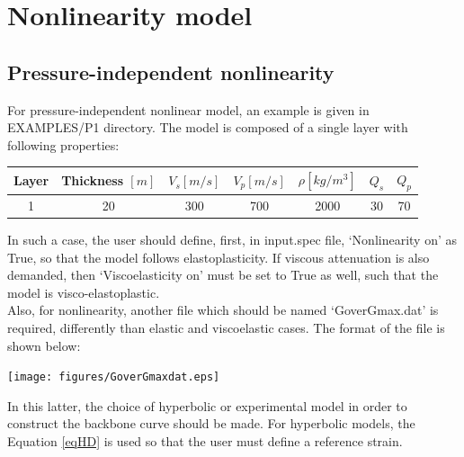 \section{Nonlinearity model}

\subsection{Pressure-independent nonlinearity}

For pressure-independent nonlinear model, an example is given in EXAMPLES\slash P1 directory.  The model is composed of a single layer with following properties: \\

\vspace{1 cm}
\label{tabP1}
\begin{center}
\begin{tabular}{|c|c|c|c|c|c|c|} \hline                                
Layer & Thickness $[m]$ & $V_{s} [m/s] $ &$V_{p} [m/s] $ & $\rho [kg/m^{3}]$ & $Q_{s}$ & $Q_{p}$ \\ \hline \hline 
1     &  20   		& 300  		& 700 		&  2000 	     & 30  & 70  \\ \hline    
\end{tabular}
\end{center}


In such a case, the user should define, first, in input.spec file, ‘Nonlinearity on’ as True, so that the model follows elastoplasticity. If viscous attenuation is also demanded, then ‘Viscoelasticity on’ must be set to True as well, such that the model is visco-elastoplastic. \\

Also, for nonlinearity, another file which should be named ‘GoverGmax.dat’ is required, differently than elastic and viscoelastic cases. The format of the file is shown below: \\

\begin{center}
\leavevmode
\texttt{[image: figures/GoverGmaxdat.eps]} 
\label{GG} 
\vspace{1cm}
\end{center}

In this latter, the choice of hyperbolic or experimental model in order to construct the backbone curve should be made. For hyperbolic models, the Equation \ref{eqHD} is used so that the user must define a reference strain. \\


